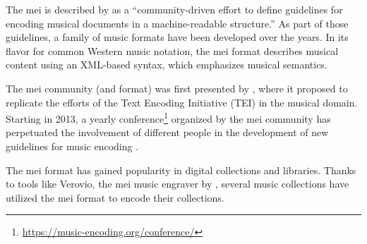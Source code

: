 

The \gls{mei} is described by
\textcite{hankinson2011music} as a ``community-driven effort
to define guidelines for encoding musical documents in a
machine-readable structure.'' As part of those guidelines, a
family of music formats have been developed over the years.
In its flavor for common Western music notation, the \gls{mei}
format describes musical content using an XML-based syntax,
which emphasizes musical semantics.


The \gls{mei} community (and format) was first presented by
\textcite{roland2002music}, where it proposed to replicate
the efforts of the Text Encoding Initiative (TEI) in the
musical domain. Starting in 2013, a yearly
conference\footnote{\href{https://music-encoding.org/conference/}{https://music-encoding.org/conference/}}
organized by the \gls{mei} community has perpetuated the
involvement of different people in the development of new
guidelines for music encoding
\parencite{crawford2016review}.


The \gls{mei} format has gained popularity in digital collections
and libraries. Thanks to tools like Verovio, the \gls{mei} music
engraver by \textcite{pugin2014verovio}, several music
collections have utilized the \gls{mei} format to encode their
collections.

